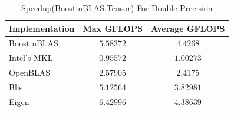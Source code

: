 \begin{table}[ht]
    \centering
    \caption{Speedup(Boost.uBLAS.Tensor) For Double-Precision}
    \begin{tabular}{|l|c|c|}
        \hline
        \textbf{Implementation} & \textbf{Max GFLOPS} & \textbf{Average GFLOPS}\\
        \hline
        Boost.uBLAS         & $5.58372$ & $4.4268$ \\
        \hline
        Intel's MKL         & $0.95572$ & $1.00273$ \\
        \hline
        OpenBLAS            & $2.57905$ & $2.4175$ \\
        \hline
        Blis                & $5.12564$ & $3.82981$ \\
        \hline
        Eigen               & $6.42996$ & $4.38639$ \\
        \hline
    \end{tabular}
\end{table}
